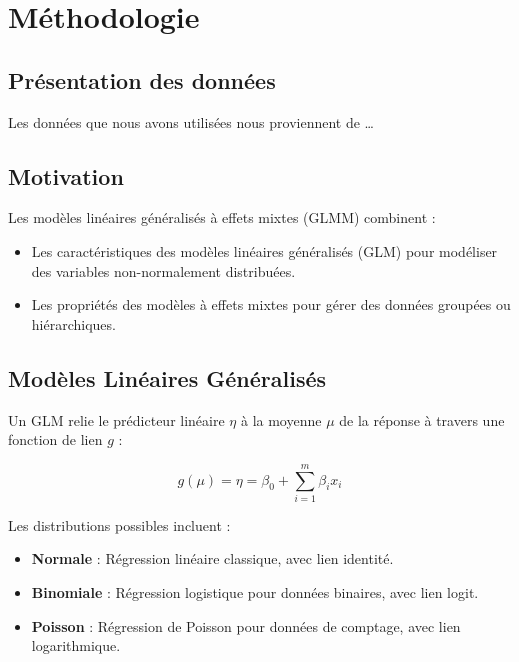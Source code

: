 \section{Méthodologie}\label{muxe9thodologie}

\subsection{Présentation des
données}\label{pruxe9sentation-des-donnuxe9es}

Les données que nous avons utilisées nous proviennent de \ldots{}

\subsection{Motivation}\label{motivation}

Les modèles linéaires généralisés à effets mixtes (GLMM) combinent :

\begin{itemize}
\item
  Les caractéristiques des modèles linéaires généralisés (GLM) pour
  modéliser des variables non-normalement distribuées.
\item
  Les propriétés des modèles à effets mixtes pour gérer des données
  groupées ou hiérarchiques.
\end{itemize}

\subsection{Modèles Linéaires
Généralisés}\label{moduxe8les-linuxe9aires-guxe9nuxe9ralisuxe9s}

Un GLM relie le prédicteur linéaire \(\eta\) à la moyenne \(\mu\) de la
réponse à travers une fonction de lien \(g\) :

\[ g(\mu) = \eta = \beta_0 + \sum_{i=1}^m \beta_i x_i \]

Les distributions possibles incluent :

\begin{itemize}
\item
  \textbf{Normale} : Régression linéaire classique, avec lien identité.
\item
  \textbf{Binomiale} : Régression logistique pour données binaires, avec
  lien logit.
\item
  \textbf{Poisson} : Régression de Poisson pour données de comptage,
  avec lien logarithmique.
\end{itemize}

